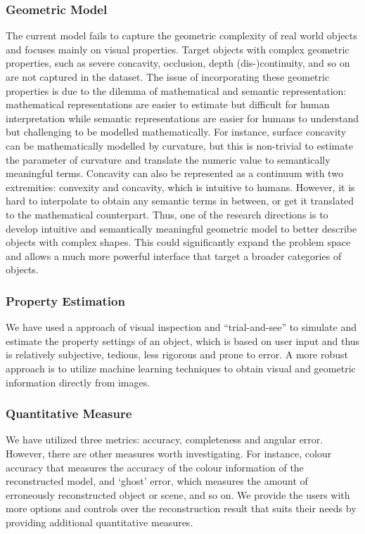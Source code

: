\subsubsection{Geometric Model}
The current model fails to capture the geometric complexity of real world objects and focuses mainly on visual properties. Target objects with complex geometric properties, such as severe concavity, occlusion, depth (dis-)continuity, and so on are not captured in the dataset. The issue of incorporating these geometric properties is due to the dilemma of mathematical and semantic representation: mathematical representations are easier to estimate but difficult for human interpretation while semantic representations are easier for humans to understand but challenging to be modelled mathematically. For instance, surface concavity can be mathematically modelled by curvature, but this is non-trivial to estimate the parameter of curvature and translate the numeric value to semantically meaningful terms. Concavity can also be represented as a continuum with two extremities: convexity and concavity, which is intuitive to humans. However, it is hard to interpolate to obtain any semantic terms in between, or get it translated to the mathematical counterpart. Thus, one of the research directions is to develop intuitive and semantically meaningful geometric model to better describe objects with complex shapes. This could significantly expand the problem space and allows a much more powerful interface that target a broader categories of objects.

\subsubsection{Property Estimation}
We have used a approach of visual inspection and ``trial-and-see'' to simulate and estimate the property settings of an object, which is based on user input and thus is relatively subjective, tedious, less rigorous and prone to error. A more robust approach is to utilize machine learning techniques to obtain visual and geometric information directly from images.

\subsubsection{Quantitative Measure}
We have utilized three metrics: accuracy, completeness and angular error. However, there are other measures worth investigating. For instance, colour accuracy that measures the accuracy of the colour information of the reconstructed model, and `ghost' error, which measures the amount of erroneously reconstructed object or scene, and so on. We provide the users with more options and controls over the reconstruction result that suits their needs by providing additional quantitative measures.

